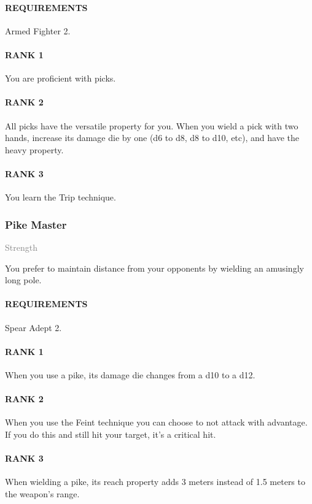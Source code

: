 \paragraph{REQUIREMENTS} Armed Fighter 2.
\paragraph{RANK 1} You are proficient with picks.
\paragraph{RANK 2} All picks have the versatile property for you.
When you wield a pick with two hands, increase its damage die by one (d6 to d8, d8 to d10, etc), and have the heavy property.
\paragraph{RANK 3} You learn the Trip technique.

\subsubsection{Pike Master} \label{feat::pikemaster}
\small{\textcolor{gray}{Strength}}

\normalsize
You prefer to maintain distance from your opponents by wielding an amusingly long pole.
\paragraph{REQUIREMENTS} Spear Adept 2.
\paragraph{RANK 1} When you use a pike, its damage die changes from a d10 to a d12.
\paragraph{RANK 2} When you use the Feint technique you can choose to not attack with advantage.
If you do this and still hit your target, it's a critical hit.
\paragraph{RANK 3} When wielding a pike, its reach property adds 3 meters instead of 1.5 meters to the weapon's range.

